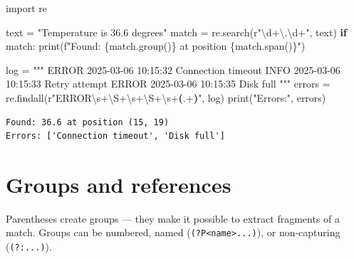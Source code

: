 \documentclass[
  english,
  letterpaper,
  DIV=11,
  numbers=noendperiod]{scrreprt}
\newenvironment{Shaded}{\begin{snugshade}}{\end{snugshade}}
\newcommand{\BuiltInTok}[1]{\textcolor[rgb]{0.00,0.23,0.31}{#1}}
\newcommand{\CharTok}[1]{\textcolor[rgb]{0.13,0.47,0.30}{#1}}
\newcommand{\ControlFlowTok}[1]{\textcolor[rgb]{0.00,0.23,0.31}{\textbf{#1}}}
\newcommand{\DecValTok}[1]{\textcolor[rgb]{0.68,0.00,0.00}{#1}}
\newcommand{\ImportTok}[1]{\textcolor[rgb]{0.00,0.46,0.62}{#1}}
\newcommand{\KeywordTok}[1]{\textcolor[rgb]{0.00,0.23,0.31}{\textbf{#1}}}
\newcommand{\NormalTok}[1]{\textcolor[rgb]{0.00,0.23,0.31}{#1}}
\newcommand{\OperatorTok}[1]{\textcolor[rgb]{0.37,0.37,0.37}{#1}}
\newcommand{\SpecialCharTok}[1]{\textcolor[rgb]{0.37,0.37,0.37}{#1}}
\newcommand{\SpecialStringTok}[1]{\textcolor[rgb]{0.13,0.47,0.30}{#1}}
\newcommand{\StringTok}[1]{\textcolor[rgb]{0.13,0.47,0.30}{#1}}
\newcommand{\VerbatimStringTok}[1]{\textcolor[rgb]{0.13,0.47,0.30}{#1}}
\begin{document}
\begin{Shaded}
\begin{Highlighting}[]
\ImportTok{import}\NormalTok{ re}

\NormalTok{text }\OperatorTok{=} \StringTok{"Temperature is 36.6 degrees"}
\NormalTok{match }\OperatorTok{=}\NormalTok{ re.search(}\VerbatimStringTok{r"}\DecValTok{\textbackslash{}d}\OperatorTok{+}\CharTok{\textbackslash{}.}\DecValTok{\textbackslash{}d}\OperatorTok{+}\VerbatimStringTok{"}\NormalTok{, text)}
\ControlFlowTok{if}\NormalTok{ match:}
    \BuiltInTok{print}\NormalTok{(}\SpecialStringTok{f"Found: }\SpecialCharTok{\{}\NormalTok{match}\SpecialCharTok{.}\NormalTok{group()}\SpecialCharTok{\}}\SpecialStringTok{ at position }\SpecialCharTok{\{}\NormalTok{match}\SpecialCharTok{.}\NormalTok{span()}\SpecialCharTok{\}}\SpecialStringTok{"}\NormalTok{)}

\NormalTok{log }\OperatorTok{=} \StringTok{"""}
\StringTok{ERROR 2025{-}03{-}06 10:15:32 Connection timeout}
\StringTok{INFO  2025{-}03{-}06 10:15:33 Retry attempt}
\StringTok{ERROR 2025{-}03{-}06 10:15:35 Disk full}
\StringTok{"""}
\NormalTok{errors }\OperatorTok{=}\NormalTok{ re.findall(}\VerbatimStringTok{r"ERROR}\DecValTok{\textbackslash{}s}\OperatorTok{+}\DecValTok{\textbackslash{}S}\OperatorTok{+}\DecValTok{\textbackslash{}s}\OperatorTok{+}\DecValTok{\textbackslash{}S}\OperatorTok{+}\DecValTok{\textbackslash{}s}\OperatorTok{+}\KeywordTok{(}\DecValTok{.}\OperatorTok{+}\KeywordTok{)}\VerbatimStringTok{"}\NormalTok{, log)}
\BuiltInTok{print}\NormalTok{(}\StringTok{"Errors:"}\NormalTok{, errors)}
\end{Highlighting}
\end{Shaded}

\begin{verbatim}
Found: 36.6 at position (15, 19)
Errors: ['Connection timeout', 'Disk full']
\end{verbatim}

\section{Groups and references}\label{groups-and-references}

Parentheses create groups --- they make it possible to extract fragments
of a match. Groups can be numbered, named
(\texttt{(?P\textless{}name\textgreater{}...)}), or non-capturing
(\texttt{(?:...)}).
\end{document}
